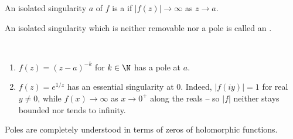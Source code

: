 \begin{definition}[Pole]
    An isolated singularity $a$ of $f$ is a  if $|f(z)| \rightarrow \infty$ as $z \rightarrow a$.
\end{definition}

\begin{definition}
    An isolated singularity which is neither removable nor a pole is called an .
\end{definition}

\begin{example}~
    \vspace*{-1.5\baselineskip}
    \begin{enumerate}[label=(\roman*)]
        \item $f(z) = (z - a)^{-k}$ for $k \in \N$ has a pole at $a$.
        \item $f(z) = e^{1/z}$ has an essential singularity at $0$. Indeed, $|f(iy)| = 1$ for real $y \neq 0$, while $f(x) \rightarrow \infty$ as $x \rightarrow 0^+$ along the reals -- so $|f|$ neither stays bounded nor tends to infinity.
    \end{enumerate}
\end{example}

Poles are completely understood in terms of zeros of holomorphic functions.

